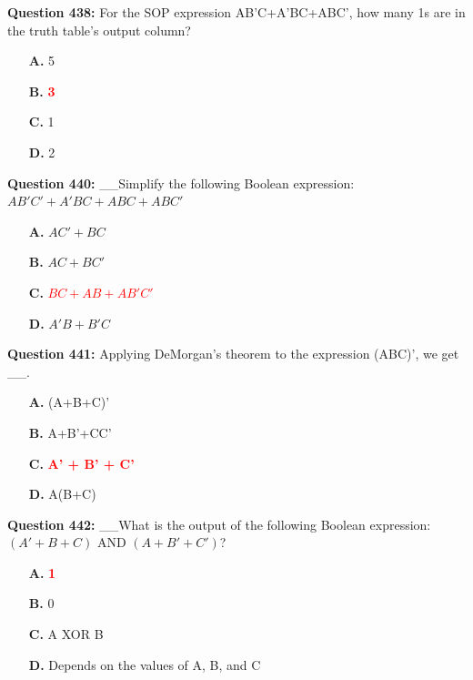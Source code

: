 \documentclass[12pt,a4paper]{article}
\begin{document}
\vspace{0.5cm}

\textbf{Question 438:} For the SOP expression AB'C+A'BC+ABC', how many 1s are in the truth table's output column?

\begin{itemize}
    \item[\textbf{A.}] 5
    \item[\textbf{B.}] \textcolor{red}{\textbf{3}}
    \item[\textbf{C.}] 1
    \item[\textbf{D.}] 2
\end{itemize}

\vspace{0.5cm}

\textbf{Question 440:} __Simplify the following Boolean expression: $AB'C' + A'BC + ABC + ABC'$

\begin{itemize}
    \item[\textbf{A.}] $AC' + BC$
    \item[\textbf{B.}] $AC + BC'$
    \item[\textbf{C.}] \textcolor{red}{\textbf{$BC + AB + AB'C'$}}
    \item[\textbf{D.}] $A'B + B'C$
\end{itemize}

\vspace{0.5cm}

\textbf{Question 441:} Applying DeMorgan's theorem to the expression (ABC)', we get __.

\begin{itemize}
    \item[\textbf{A.}] (A+B+C)'
    \item[\textbf{B.}] A+B'+CC'
    \item[\textbf{C.}] \textcolor{red}{\textbf{A' + B' + C'}}
    \item[\textbf{D.}] A(B+C)
\end{itemize}

\vspace{0.5cm}

\textbf{Question 442:} __What is the output of the following Boolean expression: $(A' + B + C)\text{ AND }(A + B' + C')$?

\begin{itemize}
    \item[\textbf{A.}] \textcolor{red}{\textbf{1}}
    \item[\textbf{B.}] 0
    \item[\textbf{C.}] A XOR B
    \item[\textbf{D.}] Depends on the values of A, B, and C
\end{itemize}
\end{document}
